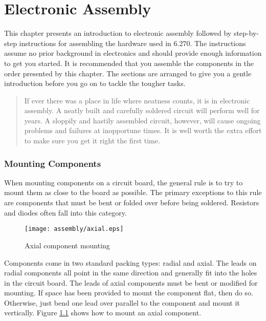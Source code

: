 \chapter{Electronic Assembly}

This chapter presents an introduction to electronic assembly followed by
step-by-step instructions for assembling the hardware used in 6.270. The
instructions assume no prior background in electronics and should provide enough
information to get you started. It is recommended that you assemble the
components in the order presented by this chapter. The sections are arranged to
give you a gentle introduction before you go on to tackle the tougher tasks.

\begin{quote}
If ever there was a place in life where neatness counts, it is in electronic
assembly. A neatly built and carefully soldered circuit will perform well for
years. A sloppily and hastily assembled circuit, however, will cause ongoing
problems and failures at inopportune times. It is well worth the extra effort to
make sure you get it right the first time.
\end{quote}

\subsection{Mounting Components}

When mounting components on a circuit board, the general rule is to
try to mount them as close to the board as possible. The primary
exceptions to this rule are components that must be bent or folded
over before being soldered. Resistors and diodes often fall into this
category.

\begin{figure}[htbp]
\begin{center}
\texttt{[image: assembly/axial.eps]}
\caption{Axial component mounting}
\label{axial}
\end{center}
\end{figure}

Components come in two standard packing types: radial and axial. The
leads on radial components all point in the same direction and
generally fit into the holes in the circuit board. The leads of axial
components must be bent or modified for mounting. If space has been
provided to mount the component flat, then do so. Otherwise, just bend
one lead over parallel to the component and mount it
vertically. Figure \ref{axial} shows how to mount an axial component.

